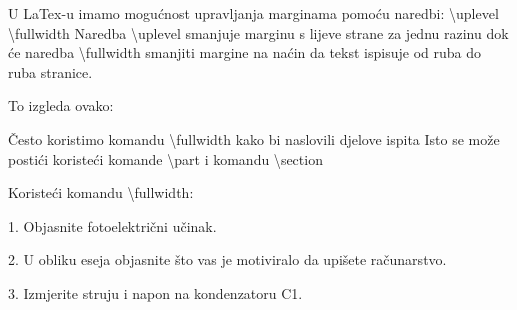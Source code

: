 \documentclass[addpoints,answers]{beamer}
\newcounter{points}
\newenvironment{questions}{\setcounter{points}{0}}{}
\newcommand{\question}[1][1]{\addtocounter{points}{#1}}
\begin{document}
%
%
%

\begin{frame}
U LaTex-u imamo mogućnost upravljanja marginama pomoću naredbi:
\newline
\newline
\color{blue}
\textbackslash{uplevel}
\newline
\newline
\color{black}
\color{blue}
\textbackslash{fullwidth}
\color{black}
\newline
\newline
Naredba \color{blue}\textbackslash{uplevel} \color{black} smanjuje marginu s lijeve strane za jednu razinu dok će naredba \color{blue} \textbackslash{fullwidth} \color{black} smanjiti margine na naćin da tekst ispisuje od ruba do ruba stranice.
\end{frame}


\begin{frame}

To izgleda ovako:
\end{frame}

\begin{frame}
\end{frame}

\begin{frame}
Često koristimo komandu \color{blue} \textbackslash{fullwidth} \color{black} kako bi naslovili djelove ispita
\newline
\newline
Isto se može postići koristeći komande \color{blue} \textbackslash{part}\color{black} \newline 
i komandu \color{blue}\textbackslash{section}\color{black}
\end{frame}

\begin{frame}
Koristeći komandu \color{blue}\textbackslash{fullwidth}\color{black}:
\newline\newline
\begin{questions}
\question
1. Objasnite fotoelektrični učinak.\newline\newline
{}\newline\newline
\question
2. U obliku eseja objasnite što vas je motiviralo da upišete računarstvo.\newline\newline
{}\newline\newline
\question
3. Izmjerite struju i napon na kondenzatoru C1.
\end{questions}

\end{frame}
\end{document}
